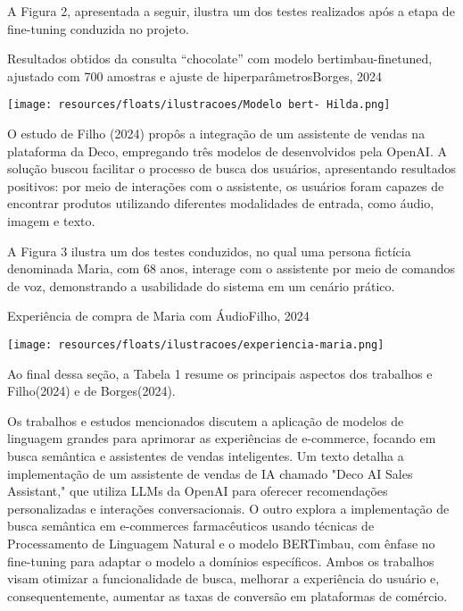 A Figura 2, apresentada a seguir, ilustra um dos testes realizados após a etapa de fine-tuning conduzida no projeto.

\begin{figura}{ Resultados obtidos da consulta “chocolate” com modelo bertimbau-finetuned, ajustado com
700 amostras e ajuste de hiperparâmetros}{Borges, 2024}
    \begin{flushleft}
        \label{fig:keypoints}
        \texttt{[image: resources/floats/ilustracoes/Modelo bert- Hilda.png]}
    \end{flushleft}
\end{figura}
\FloatBarrier


O estudo de Filho (2024) propôs a integração de um assistente de vendas na plataforma da Deco, empregando três modelos de  
desenvolvidos pela OpenAI. A solução buscou facilitar o processo de busca dos usuários, apresentando resultados positivos: 
por meio de interações com o assistente, os usuários foram capazes de encontrar produtos utilizando diferentes 
modalidades de entrada, como áudio, imagem e texto.

A Figura 3 ilustra um dos testes conduzidos, no qual uma persona fictícia denominada Maria, com 68 anos, 
interage com o assistente por meio de comandos de voz, demonstrando a usabilidade do sistema em um cenário prático.

\begin{figura}{Experiência de compra de Maria com Áudio}{Filho, 2024}
    \begin{flushleft}
        \label{fig:esqueleto}
        \texttt{[image: resources/floats/ilustracoes/experiencia-maria.png]}
    \end{flushleft}
\end{figura}
\FloatBarrier

Ao final dessa seção, a Tabela 1 resume os principais aspectos dos trabalhos e Filho(2024) e de Borges(2024).

Os trabalhos e estudos mencionados discutem a aplicação de modelos de linguagem grandes  para aprimorar as experiências de e-commerce, 
focando em busca semântica e assistentes de vendas inteligentes. Um texto detalha a implementação de 
um assistente de vendas de IA chamado "Deco AI Sales Assistant," que utiliza LLMs da OpenAI para
oferecer recomendações personalizadas e interações conversacionais. O outro explora a implementação de busca 
semântica em e-commerces farmacêuticos usando técnicas de Processamento de Linguagem Natural  e o modelo BERTimbau, 
com ênfase no fine-tuning para adaptar o modelo a domínios específicos. Ambos os trabalhos visam otimizar 
a funcionalidade de busca, melhorar a experiência do usuário e, consequentemente, aumentar as taxas de conversão em 
plataformas de comércio.


